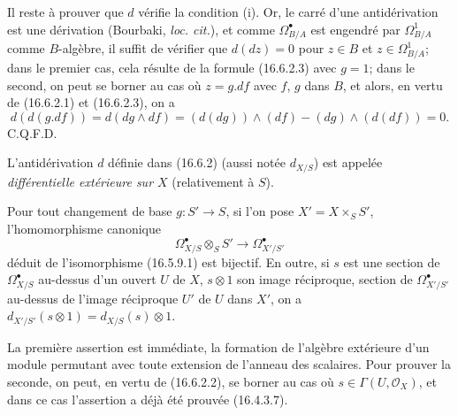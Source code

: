 Il reste à prouver que $d$ vérifie la condition (i). Or, le carré d'une
antidérivation est une dérivation (Bourbaki, \emph{loc. cit.}), et comme
$\Omega_{B/A}^{\bullet}$ est engendré par $\Omega_{B/A}^1$ comme
$B$-algèbre, il suffit de vérifier que $d(dz)=0$ pour $z\in B$ et
$z\in\Omega_{B/A}^1$; dans le premier cas, cela résulte de la formule
(16.6.2.3) avec $g=1$; dans le second, on peut se borner au cas où $z=g.df$
avec $f$, $g$ dans $B$, et alors, en vertu de (16.6.2.1) et (16.6.2.3), on a
\[
  d(d(g.df))=d(dg\wedge df)
  =(d(dg))\wedge(df)-(dg)\wedge(d(df))=0.
\]
\hfill C.Q.F.D.

\begin{definition}[16.6.3]
L'antidérivation $d$ définie dans (16.6.2) (aussi notée $d_{X/S}$) est
appelée \emph{différentielle extérieure sur $X$} (relativement à $S$).
\end{definition}

\begin{proposition}[16.6.4]
\label{IV.16.6.4}
Pour tout changement de base $g:S'\to S$, si l'on pose
$X'=X\times_S S'$, l'homomorphisme canonique
\[
  \Omega_{X/S}^{\bullet}\otimes_S S'
  \longrightarrow\Omega_{X'/S'}^{\bullet}
  \tag{16.6.4.1}
  \label{IV.16.6.4.1}
\]
déduit de l'isomorphisme (16.5.9.1) est bijectif. En outre, si $s$ est une
section de $\Omega_{X/S}^{\bullet}$ au-dessus d'un ouvert $U$ de $X$,
$s\otimes1$ son image réciproque, section de $\Omega_{X'/S'}^{\bullet}$
au-dessus de l'image réciproque $U'$ de $U$ dans $X'$, on a
$d_{X'/S'}(s\otimes1)=d_{X/S}(s)\otimes1$.
\end{proposition}

La première assertion est immédiate, la formation de l'algèbre extérieure
d'un module permutant avec toute extension de l'anneau des scalaires. Pour
prouver la seconde, on peut, en vertu de (16.6.2.2), se borner au cas où
$s\in\Gamma(U,\mathcal{O}_X)$, et dans ce cas l'assertion a déjà été prouvée
(16.4.3.7).

